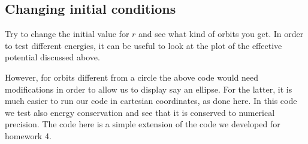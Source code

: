 \documentclass[%
oneside,                 %
final,                   %
10pt]{article}
\begin{document}
\subsection*{Changing initial conditions}

Try to change the initial value for $r$ and see what kind of orbits you get.
In order to test different energies, it can be useful to look at the plot of the effective potential discussed above.

However, for orbits different from a circle the above code would need modifications in order to allow us to display say an ellipse. For the latter, it is much easier to run our code in cartesian coordinates, as done here. In this code we test also energy conservation and see that it is conserved to numerical precision. The code here is a simple extension of the code we developed for homework 4.
\end{document}
